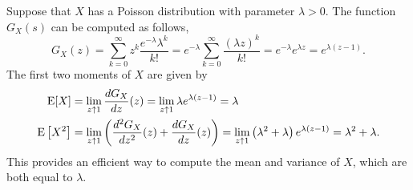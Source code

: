 \begin{example}
Suppose that $X$ has a Poisson distribution with parameter $\lambda > 0$.
The function $G_X(s)$ can be computed as follows,
\begin{equation*}
G_X(z) = \sum_{k = 0}^\infty z^{k} \frac{e^{-\lambda}\lambda^k}{k!}
= e^{-\lambda} \sum_{k = 0}^\infty \frac{(\lambda z)^k}{k!}
= e^{-\lambda} e^{\lambda z} = e^{\lambda(z - 1)} .
\end{equation*}
The first two moments of $X$ are given by
\begin{align*}
\mathrm{E} [X] &= \lim_{z \uparrow 1} \frac{d G_X}{dz} (z)
= \lim_{z \uparrow 1} \lambda e^{\lambda(z - 1)} = \lambda \\
\mathrm{E} \left[ X^2 \right] &= \lim_{z \uparrow 1}
\left( \frac{d^2 G_X}{dz^2} (z) + \frac{d G_X}{dz} (z) \right)
= \lim_{z \uparrow 1} \left( \lambda^2 + \lambda \right)
e^{\lambda (z - 1)} = \lambda^2 + \lambda .
\end{align*}
This provides an efficient way to compute the mean and variance of $X$, which are both equal to $\lambda$.
\end{example}

